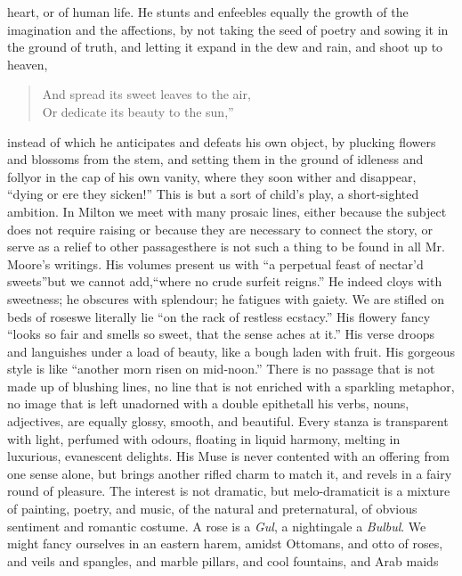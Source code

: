 heart, or of human life. He stunts and enfeebles equally the
growth of the imagination and the affections, by not taking the
seed of poetry and sowing it in the ground of truth, and letting
it expand in the dew and rain, and shoot up to heaven,
\begin{verse}
  And spread its sweet leaves to the air, \\
  Or dedicate its beauty to the sun,''\textemdash 
\end{verse}
instead of which he anticipates and defeats his own object, by
plucking flowers and blossoms from the stem, and setting them in
the ground of idleness and folly\textemdash or in the cap of his
own vanity, where they soon wither and disappear, ``dying or ere
they sicken!'' This is but a sort of child's play, a short-sighted
ambition. In Milton we meet with many prosaic lines, either
because the subject does not require raising or because they are
necessary to connect the story, or serve as a relief to other
passages\textemdash there is not such a thing to be found in all
Mr. Moore's writings. His volumes present us with ``a perpetual
feast of nectar'd sweets''\textemdash but we cannot
add,\textemdash ``where no crude surfeit reigns.'' He indeed cloys
with sweetness; he obscures with splendour; he fatigues with
gaiety. We are stifled on beds of roses\textemdash we literally
lie ``on the rack of restless ecstacy.'' His flowery fancy ``looks
so fair and smells so sweet, that the sense aches at it.'' His
verse droops and languishes under a load of beauty, like a bough
laden with fruit. His gorgeous style is like ``another morn risen
on mid-noon.'' There is no passage that is not made up of blushing
lines, no line that is not enriched with a sparkling metaphor, no
image that is left unadorned with a double epithet\textemdash all
his verbs, nouns, adjectives, are equally glossy, smooth, and
beautiful. Every stanza is transparent with light, perfumed with
odours, floating in liquid harmony, melting in luxurious,
evanescent delights. His Muse is never contented with an offering
from one sense alone, but brings another rifled charm to match it,
and revels in a fairy round of pleasure. The interest is not
dramatic, but melo-dramatic\textemdash it is a mixture of
painting, poetry, and music, of the natural and preternatural, of
obvious sentiment and romantic costume. A rose is a \emph{Gul}, a
nightingale a \emph{Bulbul}. We might fancy ourselves in an
eastern harem, amidst Ottomans, and otto of roses, and veils and
spangles, and marble pillars, and cool fountains, and Arab maids
